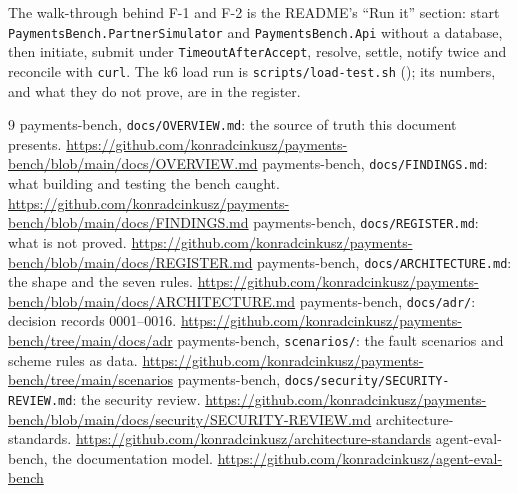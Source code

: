 \documentclass[11pt,a4paper]{article}
\begin{document}
The walk-through behind F-1 and F-2 is the README's ``Run it'' section: start
\texttt{PaymentsBench.PartnerSimulator} and \texttt{PaymentsBench.Api} without a database, then
initiate, submit under \texttt{TimeoutAfterAccept}, resolve, settle, notify twice and reconcile with
\texttt{curl}. The k6 load run is \texttt{scripts/load-test.sh} (); its
numbers, and what they do not prove, are in the register.

\begin{thebibliography}{9}
 payments-bench, \texttt{docs/OVERVIEW.md}: the source of truth this document presents. \url{https://github.com/konradcinkusz/payments-bench/blob/main/docs/OVERVIEW.md}
 payments-bench, \texttt{docs/FINDINGS.md}: what building and testing the bench caught. \url{https://github.com/konradcinkusz/payments-bench/blob/main/docs/FINDINGS.md}
 payments-bench, \texttt{docs/REGISTER.md}: what is not proved. \url{https://github.com/konradcinkusz/payments-bench/blob/main/docs/REGISTER.md}
 payments-bench, \texttt{docs/ARCHITECTURE.md}: the shape and the seven rules. \url{https://github.com/konradcinkusz/payments-bench/blob/main/docs/ARCHITECTURE.md}
 payments-bench, \texttt{docs/adr/}: decision records 0001--0016. \url{https://github.com/konradcinkusz/payments-bench/tree/main/docs/adr}
 payments-bench, \texttt{scenarios/}: the fault scenarios and scheme rules as data. \url{https://github.com/konradcinkusz/payments-bench/tree/main/scenarios}
 payments-bench, \texttt{docs/security/SECURITY-REVIEW.md}: the security review. \url{https://github.com/konradcinkusz/payments-bench/blob/main/docs/security/SECURITY-REVIEW.md}
 architecture-standards. \url{https://github.com/konradcinkusz/architecture-standards}
 agent-eval-bench, the documentation model. \url{https://github.com/konradcinkusz/agent-eval-bench}
\end{thebibliography}
\end{document}
